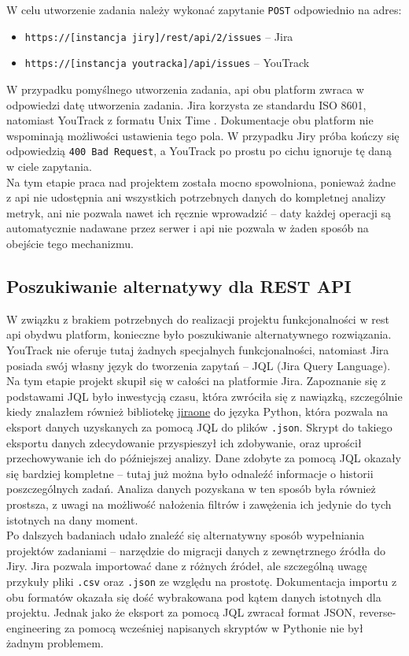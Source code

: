 W celu utworzenie zadania należy wykonać zapytanie \texttt{POST} odpowiednio na adres:
\begin{itemize}
    \item \texttt{https://[instancja jiry]/rest/api/2/issues} -- Jira
    \item \texttt{https://[instancja youtracka]/api/issues} -- YouTrack
\end{itemize}
W przypadku pomyślnego utworzenia zadania, api obu platform zwraca w odpowiedzi datę utworzenia zadania.
Jira korzysta ze standardu ISO 8601, natomiast YouTrack z formatu Unix Time \cite{UnixProgrammersManual}.
Dokumentacje obu platform nie wspominają możliwości ustawienia tego pola. W przypadku Jiry próba kończy się odpowiedzią \texttt{400 Bad Request}, a YouTrack po prostu po cichu ignoruje tę daną
w ciele zapytania.\\
Na tym etapie praca nad projektem została mocno spowolniona, ponieważ żadne z api nie udostępnia ani wszystkich potrzebnych danych do kompletnej analizy metryk, ani nie pozwala nawet ich ręcznie wprowadzić -- daty każdej operacji
są automatycznie nadawane przez serwer i api nie pozwala w żaden sposób na obejście tego mechanizmu.

\subsection*{Poszukiwanie alternatywy dla REST API}
W związku z brakiem potrzebnych do realizacji projektu funkcjonalności w rest api obydwu platform, konieczne było poszukiwanie alternatywnego rozwiązania.
YouTrack nie oferuje tutaj żadnych specjalnych funkcjonalności, natomiast Jira posiada swój własny język do tworzenia zapytań -- JQL (Jira Query Language). \cite{YouTrackSearch} \cite{JiraJQL}
Na tym etapie projekt skupił się w całości na platformie Jira. Zapoznanie się z podstawami JQL było inwestycją czasu, która zwróciła się z nawiązką, szczególnie kiedy znalazłem również bibliotekę \href{https://pypi.org/project/jiraone/}{jiraone} do języka Python,
która pozwala na eksport danych uzyskanych za pomocą JQL do plików \texttt{.json}. Skrypt do takiego eksportu danych zdecydowanie przyspieszył ich zdobywanie, oraz uprościł przechowywanie ich do późniejszej analizy.
Dane zdobyte za pomocą JQL okazały się bardziej kompletne -- tutaj już można było odnaleźć informacje o historii poszczególnych zadań. Analiza danych pozyskana w ten sposób była również prostsza, z uwagi na możliwość nałożenia filtrów i zawężenia ich
jedynie do tych istotnych na dany moment.\\
Po dalszych badaniach udało znaleźć się alternatywny sposób wypełniania projektów zadaniami -- narzędzie do migracji danych z zewnętrznego źródła do Jiry. \cite{JiraImportExport}
Jira pozwala importować dane z różnych źródeł, ale szczególną uwagę przykuły pliki \texttt{.csv} oraz \texttt{.json} ze względu na prostotę.
Dokumentacja importu z obu formatów okazała się dość wybrakowana pod kątem danych istotnych dla projektu. Jednak jako że eksport za pomocą JQL zwracał format JSON, reverse-engineering za pomocą wcześniej napisanych skryptów w Pythonie nie był
żadnym problemem.

